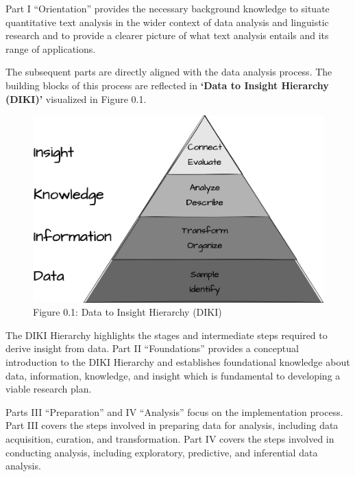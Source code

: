 \documentclass[
  letterpaper,
  krantz1]{latex/krantz-mod}
\theoremstyle{definition}
\theoremstyle{definition}
\theoremstyle{remark}
\begin{document}
Part I ``Orientation'' provides the necessary background knowledge to
situate quantitative text analysis in the wider context of data analysis
and linguistic research and to provide a clearer picture of what text
analysis entails and its range of applications.

The subsequent parts are directly aligned with the data analysis
process. The building blocks of this process are reflected in
\textbf{`Data to Insight
Hierarchy (DIKI)'} visualized in Figure 0.1.

\begin{figure}

\centering
\includegraphics[width=0.75\linewidth]{part_0/figures/preface-diki.drawio.png}

\captionsetup{labelformat=empty,labelsep=none}
\caption[Figure 0.1: Data to Insight Hierarchy (DIKI)]{Figure 0.1: Data to Insight Hierarchy (DIKI)\footnotemark{}}

\end{figure}%


The DIKI Hierarchy highlights the stages and intermediate steps required
to derive insight from data. Part II ``Foundations'' provides a
conceptual introduction to the DIKI Hierarchy and establishes
foundational knowledge about data, information, knowledge, and insight
which is fundamental to developing a viable research plan.

Parts III ``Preparation'' and IV ``Analysis'' focus on the
implementation process. Part III covers the steps involved in preparing
data for analysis, including data acquisition, curation, and
transformation. Part IV covers the steps involved in conducting
analysis, including exploratory, predictive, and inferential data
analysis.
\end{document}
